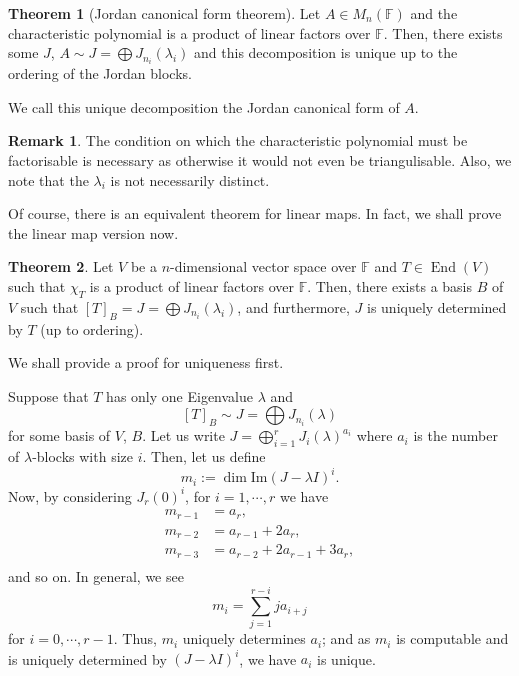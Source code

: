 \documentclass[
]{article}
\theoremstyle{definition}
\newtheorem{theorem}{Theorem}
\newtheorem*{remark}{Remark}
\theoremstyle{definition}
\begin{document}
\begin{theorem}[Jordan canonical form theorem]
  Let \(A \in M_n(\mathbb{F})\) and the characteristic polynomial is a product 
  of linear factors over \(\mathbb{F}\). Then, 
  there exists some \(J\), \(A \sim J = \bigoplus J_{n_i}(\lambda_i)\) and 
  this decomposition is unique up to the ordering of the Jordan blocks.
\end{theorem}

We call this unique decomposition the Jordan canonical form of \(A\).

\begin{remark}
  The condition on which the characteristic polynomial must be factorisable is 
  necessary as otherwise it would not even be triangulisable. Also, we note that 
  the \(\lambda_i\) is not necessarily distinct.
\end{remark}

Of course, there is an equivalent theorem for linear maps. In fact, we
shall prove the linear map version now.

\begin{theorem}
  Let \(V\) be a \(n\)-dimensional vector space over \(\mathbb{F}\) and 
  \(T \in \mathop{\mathrm{End}}(V)\) such that \(\chi_T\) is a product of linear factors over 
  \(\mathbb{F}\). Then, there exists a basis \(B\) of \(V\) such that 
  \([T]_B = J = \bigoplus J_{n_i}(\lambda_i)\), and furthermore, \(J\) is 
  uniquely determined by \(T\) (up to ordering).
\end{theorem}
\proof

We shall provide a proof for uniqueness first.

Suppose that \(T\) has only one Eigenvalue \(\lambda\) and
\[[T]_B \sim J = \bigoplus J_{n_i}(\lambda)\] for some basis of \(V\),
\(B\). Let us write \(J = \bigoplus_{i = 1}^r J_i(\lambda)^{a_i}\) where
\(a_i\) is the number of \(\lambda\)-blocks with size \(i\). Then, let
us define \[m_i := \dim \text{Im}(J - \lambda I)^i.\] Now, by
considering \(J_r(0)^i\), for \(i = 1, \cdots, r\) we have
\begin{align*}
    m_{r - 1} & = a_r,\\ 
    m_{r - 2} & = a_{r - 1} + 2a_r,\\
    m_{r - 3} & = a_{r - 2} + 2a_{r - 1} + 3a_r,\\
  \end{align*} and so on. In general, we see
\[m_i = \sum_{j = 1}^{r - i} j a_{i + j}\] for \(i = 0, \cdots, r - 1\).
Thus, \(m_i\) uniquely determines \(a_i\); and as \(m_i\) is computable
and is uniquely determined by \((J - \lambda I)^i\), we have \(a_i\) is
unique.
\end{document}
